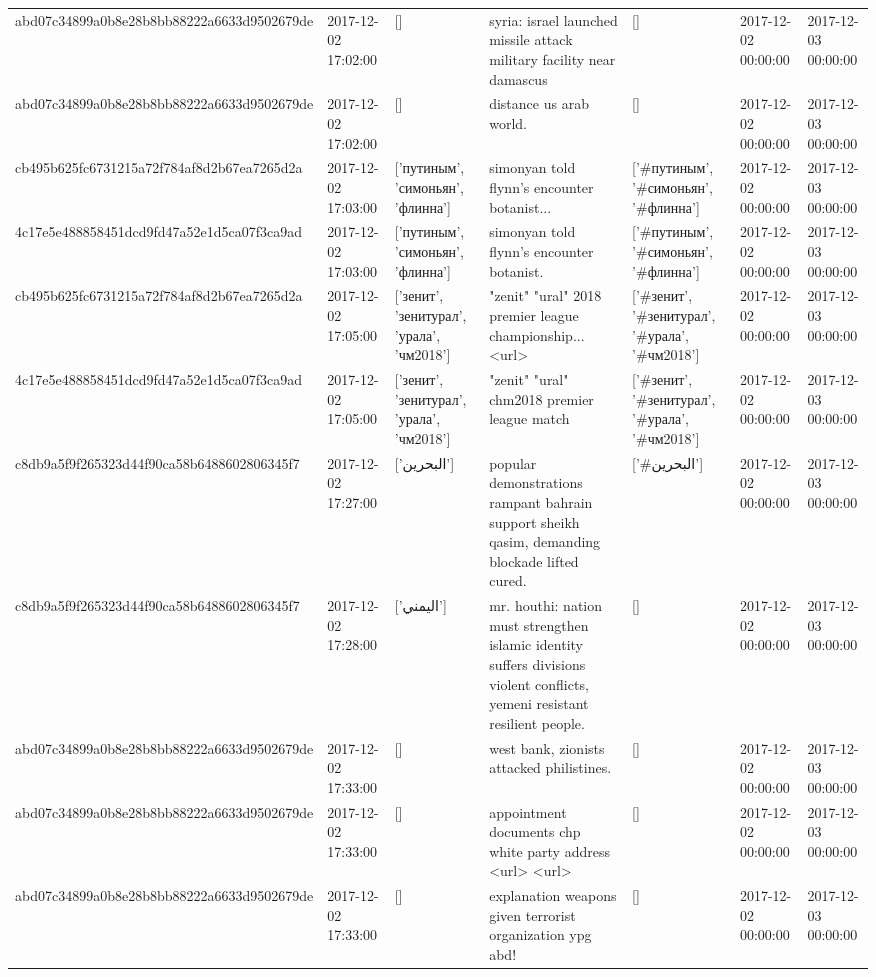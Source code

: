 \begin{tabular}{lllllll}
abd07c34899a0b8e28b8bb88222a6633d9502679de & 2017-12-02 17:02:00 & [] & syria: israel launched missile attack military facility near damascus & [] & 2017-12-02 00:00:00 & 2017-12-03 00:00:00 \\
abd07c34899a0b8e28b8bb88222a6633d9502679de & 2017-12-02 17:02:00 & [] & distance us arab world. & [] & 2017-12-02 00:00:00 & 2017-12-03 00:00:00 \\
cb495b625fc6731215a72f784af8d2b67ea7265d2a & 2017-12-02 17:03:00 & ['путиным', 'симоньян', 'флинна'] & simonyan told flynn's encounter botanist... & ['#путиным', '#симоньян', '#флинна'] & 2017-12-02 00:00:00 & 2017-12-03 00:00:00 \\
4c17e5e488858451dcd9fd47a52e1d5ca07f3ca9ad & 2017-12-02 17:03:00 & ['путиным', 'симоньян', 'флинна'] & simonyan told flynn's encounter botanist. & ['#путиным', '#симоньян', '#флинна'] & 2017-12-02 00:00:00 & 2017-12-03 00:00:00 \\
cb495b625fc6731215a72f784af8d2b67ea7265d2a & 2017-12-02 17:05:00 & ['зенит', 'зенитурал', 'урала', 'чм2018'] & "zenit" "ural" 2018 premier league championship... <url> & ['#зенит', '#зенитурал', '#урала', '#чм2018'] & 2017-12-02 00:00:00 & 2017-12-03 00:00:00 \\
4c17e5e488858451dcd9fd47a52e1d5ca07f3ca9ad & 2017-12-02 17:05:00 & ['зенит', 'зенитурал', 'урала', 'чм2018'] & "zenit" "ural" chm2018 premier league match & ['#зенит', '#зенитурал', '#урала', '#чм2018'] & 2017-12-02 00:00:00 & 2017-12-03 00:00:00 \\
c8db9a5f9f265323d44f90ca58b6488602806345f7 & 2017-12-02 17:27:00 & ['البحرين'] & popular demonstrations rampant bahrain support sheikh qasim, demanding blockade lifted cured. & ['#البحرين'] & 2017-12-02 00:00:00 & 2017-12-03 00:00:00 \\
c8db9a5f9f265323d44f90ca58b6488602806345f7 & 2017-12-02 17:28:00 & ['اليمني'] & mr. houthi: nation must strengthen islamic identity suffers divisions violent conflicts, yemeni resistant resilient people. & [] & 2017-12-02 00:00:00 & 2017-12-03 00:00:00 \\
abd07c34899a0b8e28b8bb88222a6633d9502679de & 2017-12-02 17:33:00 & [] & west bank, zionists attacked philistines. & [] & 2017-12-02 00:00:00 & 2017-12-03 00:00:00 \\
abd07c34899a0b8e28b8bb88222a6633d9502679de & 2017-12-02 17:33:00 & [] & appointment documents chp white party address <url> <url> & [] & 2017-12-02 00:00:00 & 2017-12-03 00:00:00 \\
abd07c34899a0b8e28b8bb88222a6633d9502679de & 2017-12-02 17:33:00 & [] & explanation weapons given terrorist organization ypg abd! & [] & 2017-12-02 00:00:00 & 2017-12-03 00:00:00 \\

\end{tabular}
